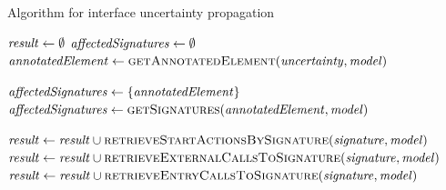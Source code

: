 \begin{algorithm}
    \caption{Algorithm for interface uncertainty propagation}
    \label{alg:impactanalysis:interface}
    \begin{algorithmic}[1]
        \algindentskip
        \State $\mathit{result} \gets \emptyset$
        \State $\mathit{affectedSignatures} \gets \emptyset$
        \State $\mathit{annotatedElement} \gets \textsc{getAnnotatedElement}(\mathit{uncertainty}, \mathit{model})$ \label{alg:impactanalysis:interface:4}
        \algblockskip

         \label{alg:impactanalysis:interface:5}
                \State $\mathit{affectedSignatures} \gets \{ \mathit{annotatedElement} \}$
            \EndCase
             
                \State $\mathit{affectedSignatures} \gets \textsc{getSignatures}(\mathit{annotatedElement}, \mathit{model})$
            \EndCase
        \EndSwitch
        \algblockskip

          \label{alg:impactanalysis:interface:10}
            \State $\mathit{result} \gets \mathit{result} \cup \textsc{retrieveStartActionsBySignature}(\mathit{signature}, \mathit{model})$
            \State $\mathit{result} \gets \mathit{result} \cup \textsc{retrieveExternalCallsToSignature}(\mathit{signature}, \mathit{model})$
            \State $\mathit{result} \gets \mathit{result} \cup \textsc{retrieveEntryCallsToSignature}(\mathit{signature}, \mathit{model})$
        \EndFor
        \algblockskip

        \State {}
        \algindentskip
        \EndProcedure   
    \end{algorithmic}
\end{algorithm}

